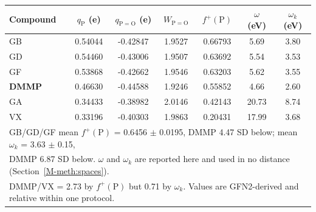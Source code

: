 \begin{tabular}{lcccccc}
\hline
Compound & $q_{\mathrm{P}}$ (e) & $q_{\mathrm{P=O}}$ (e) & $W_{\mathrm{P=O}}$ &
$f^{+}(\mathrm{P})$ & $\omega$ (eV) & $\omega_k$ (eV) \\
\hline
GB & 0.54044 & -0.42847 & 1.9527 & 0.66793 & 5.69 & 3.80 \\
GD & 0.54460 & -0.43006 & 1.9507 & 0.63692 & 5.54 & 3.53 \\
GF & 0.53868 & -0.42662 & 1.9546 & 0.63203 & 5.62 & 3.55 \\
\textbf{DMMP} & 0.46630 & -0.44588 & 1.9246 & 0.55852 & 4.66 & 2.60 \\
GA & 0.34433 & -0.38982 & 2.0146 & 0.42143 & 20.73 & 8.74 \\
VX & 0.33196 & -0.40303 & 1.9863 & 0.20431 & 17.99 & 3.68 \\
\hline
\multicolumn{7}{l}{\footnotesize GB/GD/GF mean $f^{+}(\mathrm{P})$ = 0.6456
$\pm$ 0.0195, DMMP 4.47 SD below; mean $\omega_k$ = 3.63 $\pm$ 0.15,}\\
\multicolumn{7}{l}{\footnotesize DMMP 6.87 SD below. $\omega$ and $\omega_k$ are
reported here and used in no distance (Section~\ref{M-meth:spaces}).}\\
\multicolumn{7}{l}{\footnotesize DMMP/VX = 2.73 by $f^{+}(\mathrm{P})$ but 0.71 by
$\omega_k$. Values are GFN2-derived and relative within one protocol.}\\
\end{tabular}
